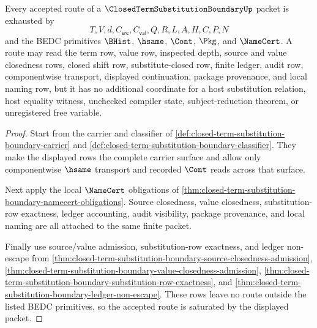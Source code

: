 \begin{theorem}
\label{thm:closed-term-substitution-boundary-route-saturation}
Every accepted route of a $\ClosedTermSubstitutionBoundaryUp$ packet is exhausted by
$$
T,V,d,C_{\mathsf{src}},C_{\mathsf{val}},Q,R,L,A,H,C,P,N
$$
and the BEDC primitives $\BHist$, $\hsame$, $\Cont$, $\Pkg$, and $\NameCert$. A route may read the term row, value row, inspected depth, source and value closedness rows, closed shift row, substitute-closed row, finite ledger, audit row, componentwise transport, displayed continuation, package provenance, and local naming row, but it has no additional coordinate for a host substitution relation, host equality witness, unchecked compiler state, subject-reduction theorem, or unregistered free variable.
\end{theorem}
\begin{proof}
Start from the carrier and classifier of \autoref{def:closed-term-substitution-boundary-carrier} and \autoref{def:closed-term-substitution-boundary-classifier}. They make the displayed rows the complete carrier surface and allow only componentwise $\hsame$ transport and recorded $\Cont$ reads across that surface.

Next apply the local $\NameCert$ obligations of \autoref{thm:closed-term-substitution-boundary-namecert-obligations}. Source closedness, value closedness, substitution-row exactness, ledger accounting, audit visibility, package provenance, and local naming are all attached to the same finite packet.

Finally use source/value admission, substitution-row exactness, and ledger non-escape from \autoref{thm:closed-term-substitution-boundary-source-closedness-admission}, \autoref{thm:closed-term-substitution-boundary-value-closedness-admission}, \autoref{thm:closed-term-substitution-boundary-substitution-row-exactness}, and \autoref{thm:closed-term-substitution-boundary-ledger-non-escape}. These rows leave no route outside the listed BEDC primitives, so the accepted route is saturated by the displayed packet.
\end{proof}

